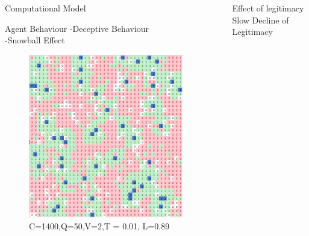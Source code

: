 \documentclass[final,hyperref={pdfpagelabels=false}]{beamer}
\begin{document}
\begin{frame}[t]
\begin{columns}[t]
\begin{column}{.32\textwidth}
\begin{block}{Computational Model}
					\end{block}
				\begin{block}{Agent Behaviour}
					-Deceptive Behaviour\\
					-Snowball Effect
					\begin{figure}[H]
						\includegraphics[width=\linewidth]{snowball_2.png}
						\caption{C=1400,Q=50,V=2,T = 0.01, L=0.89}
						\label{fig:}
					\end{figure}
					
				
			
				\end{block}
					
				
					
				\end{column} %
				
				
				
				
				
				\begin{column}{.02\textwidth}\end{column} %
				\begin{column}{.3\textwidth} %
					\begin{block}{Effect of legitimacy}
					Slow Decline of Legitimacy
				

\end{block}
\end{column}
\end{columns}
\end{frame}
\end{document}
